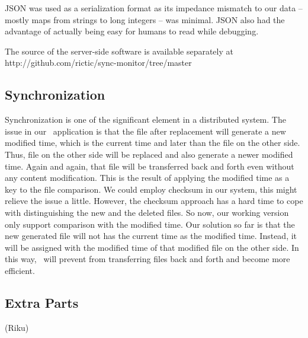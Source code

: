 JSON was used as a serialization format as its impedance mismatch to our data – mostly maps from strings to long integers – was minimal.  JSON also had the advantage of actually being easy for humans to read while debugging.

The source of the server-side software is available separately at http://github.com/rictic/sync-monitor/tree/master

\subsection{Synchronization}
Synchronization is one of the significant element in a distributed system. The issue in our \teledroid\ application is that the file after replacement will generate a new modified time, which is the current time and later than the file on the other side. Thus, file on the other side will be replaced and also generate a newer modified time. Again and again, that file will be transferred back and forth even without any content modification. This is the result of applying the modified time as a key to the file comparison. We could employ checksum in our system, this might relieve the issue a little. However, the checksum approach has a hard time to cope with distinguishing the new and the deleted files. So now, our working version only support comparison with the modified time. Our solution so far is that the new generated file will not has the current time as the modified time. Instead, it will be assigned with the modified time of that modified file on the other side. In this way, \teledroid\ will prevent from transferring files back and forth and become more efficient.

\subsection{Extra Parts}
(Riku)
